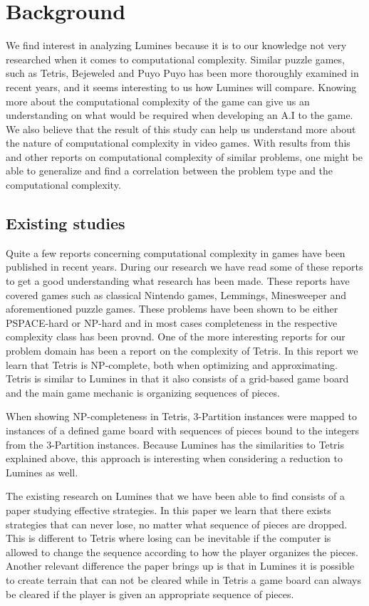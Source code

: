 \section{Background}

We find interest in analyzing Lumines because it is to our knowledge not very researched when it comes to computational complexity. Similar puzzle games, such as Tetris, Bejeweled and Puyo Puyo has been more thoroughly examined in recent years, and it seems interesting to us how 
Lumines will compare. Knowing more about the computational complexity of the game can give us an understanding on what would be required when developing an A.I to the game.  We also believe that the result of this study can help us understand more about the nature of computational complexity in video games. With results from this and other reports on computational complexity of similar problems, one might be able to generalize and find a correlation between the problem type and the computational complexity. 

\subsection{Existing studies}

Quite a few reports concerning computational complexity in games have been published in recent years. During our research we have read some of these reports to get a good understanding what research has been made. These reports have covered games such as classical Nintendo games, 
Lemmings, Minesweeper and aforementioned puzzle games. These problems have been shown to be either PSPACE-hard or NP-hard and in most cases completeness in the respective complexity class has been provnd.
One of the more interesting reports for our problem domain has been a report on the complexity of Tetris. In this report we learn that Tetris is NP-complete, both when optimizing and approximating. Tetris is similar to Lumines in that it also consists of a grid-based game board and the main game mechanic is organizing sequences of pieces.

When showing NP-completeness in Tetris, 3-Partition instances were mapped to instances of a defined game board with sequences of pieces bound to the integers from the 3-Partition instances. Because Lumines has the similarities to Tetris explained above, this approach is interesting when considering a reduction to Lumines as well.

The existing research on Lumines that we have been able to find consists of a paper studying effective strategies. In this paper we learn that there exists strategies that can never lose, no matter what sequence of pieces are dropped. This is different to Tetris where losing can be inevitable if the computer is allowed to change the sequence according to how the player organizes the pieces. Another relevant difference the paper brings up is that in Lumines it is possible to create terrain that can not be cleared while in Tetris a game board can always be cleared if the player is given an appropriate sequence of pieces.



